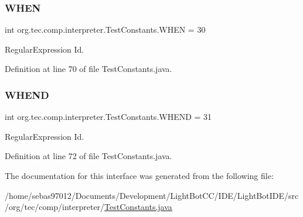 \mbox{\label{interfaceorg_1_1tec_1_1comp_1_1interpreter_1_1_test_constants_ad95b1af33c698635287f07ed004e0e76}} 
\subsubsection{\texorpdfstring{W\+H\+EN}{WHEN}}
{\footnotesize\ttfamily int org.\+tec.\+comp.\+interpreter.\+Test\+Constants.\+W\+H\+EN = 30}

Regular\+Expression Id. 

Definition at line 70 of file Test\+Constants.\+java.

\mbox{\label{interfaceorg_1_1tec_1_1comp_1_1interpreter_1_1_test_constants_a85fc9daf2a90533ede4b46f744cb4962}} 
\subsubsection{\texorpdfstring{W\+H\+E\+ND}{WHEND}}
{\footnotesize\ttfamily int org.\+tec.\+comp.\+interpreter.\+Test\+Constants.\+W\+H\+E\+ND = 31}

Regular\+Expression Id. 

Definition at line 72 of file Test\+Constants.\+java.



The documentation for this interface was generated from the following file\+:\begin{DoxyCompactItemize}
\item 
/home/sebas97012/\+Documents/\+Development/\+Light\+Bot\+C\+C/\+I\+D\+E/\+Light\+Bot\+I\+D\+E/src/org/tec/comp/interpreter/\mbox{\hyperlink{_test_constants_8java}{Test\+Constants.\+java}}\end{DoxyCompactItemize}

